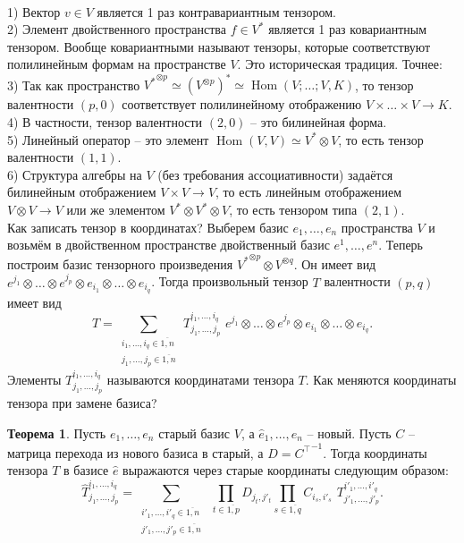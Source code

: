 \documentclass[10pt,a4paper,oneside]{book}
\theoremstyle{definition}
\newtheorem{thm}{\color{red!40!black}Теорема}
\newcommand{\ovl}{\overline}
\newcommand{\Hom}{\operatorname{Hom}}
\def\exm{\noindent {\bf Примеры:}}
\def\thrm{\begin{thm}}
\def\ethrm{\end{thm}}
\begin{document}
\exm\\
1) Вектор $v\in V$ является 1 раз контравариантным тензором.\\
2) Элемент двойственного пространства $f \in V^{*}$ является 1 раз ковариантным тензором. Вообще ковариантными называют тензоры, которые соответствуют полилинейным формам на пространстве $V$. Это историческая традиция. Точнее:\\
3) Так как пространство ${V^{*}}^{\otimes p} \simeq \left(V^{\otimes p}\right)^*\simeq \Hom(V;\dots;V,K)$, то тензор валентности $(p,0)$ соответствует полилинейному отображению $V\times\dots \times V \to K$.\\
4) В частности, тензор валентности $(2,0)$ -- это билинейная форма.\\
5) Линейный оператор -- это элемент $\Hom(V,V)\simeq V^{*}\otimes V$, то есть тензор валентности $(1,1)$.\\
6) Структура алгебры на $V$ (без требования ассоциативности) задаётся билинейным отображением $V \times V \to V$, то есть линейным отображением $V\otimes V \to V$ или же элементом $V^{*}\otimes V^* \otimes V$, то есть тензором типа $(2,1)$.\\

Как записать тензор в координатах? Выберем базис $e_1,\dots,e_n$ пространства $V$ и возьмём в двойственном пространстве двойственный базис $e^1,\dots,e^n$. Теперь построим базис тензорного произведения ${V^{*}}^{\otimes p}\otimes V^{\otimes q}$. Он имеет вид $e^{j_1}\otimes\dots\otimes e^{j_p}\otimes e_{i_1}\otimes \dots \otimes e_{i_q}$. Тогда произвольный тензор $T$ валентности $(p,q)$ имеет вид 
$$ T= \sum_{\substack{i_1,\dots,i_q \in \ovl{1,n}\\ j_1,\dots,j_p \in \ovl{1,n}} } \,T_{j_1,\dots,j_p}^{i_1,\dots,i_q}\,\, e^{j_1}\otimes\dots\otimes e^{j_p}\otimes e_{i_1}\otimes \dots \otimes e_{i_q}.$$
Элементы $T_{j_1,\dots,j_p}^{i_1,\dots,i_q}$ называются координатами тензора $T$. Как меняются координаты тензора при замене базиса? 

\thrm Пусть $e_1,\dots,e_n$ старый базис $V$, а $\hat{e}_1,\dots,\hat{e}_n$ -- новый. Пусть $C$ -- матрица перехода из нового базиса в старый, а $D={C^{\top}}^{-1}$. Тогда координаты тензора $T$ в базисе $\hat{e}$ выражаются через старые координаты следующим образом:
$$\hat{T}_{j_1,\dots,j_p}^{i_1,\dots,i_q}=\sum_{\substack{i'_1,\dots,i'_q \in \ovl{1,n}\\ j'_1,\dots,j'_p \in \ovl{1,n}}} \,\,
\prod_{t\in \ovl{1,p}} D_{j_t,j'_t} \prod_{s\in \ovl{1,q}} C_{i_s,i'_s}  \,\,T_{j'_1,\dots,j'_p}^{i'_1,\dots,i'_q}.$$
\ethrm
\end{document}

